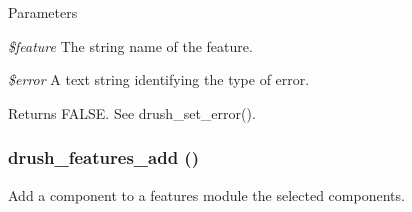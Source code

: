 \begin{DoxyParams}{Parameters}
\item[{\em \$feature}]The string name of the feature. \item[{\em \$error}]A text string identifying the type of error. \end{DoxyParams}
\begin{DoxyReturn}{Returns}
FALSE. See drush\_\-set\_\-error(). 
\end{DoxyReturn}
\hypertarget{features_8drush_8inc_a4c44d06332931a2474f148f6d1469436}{
\subsubsection[{drush\_\-features\_\-add}]{\setlength{\rightskip}{0pt plus 5cm}drush\_\-features\_\-add ()}}
\label{features_8drush_8inc_a4c44d06332931a2474f148f6d1469436}
Add a component to a features module the selected components.

